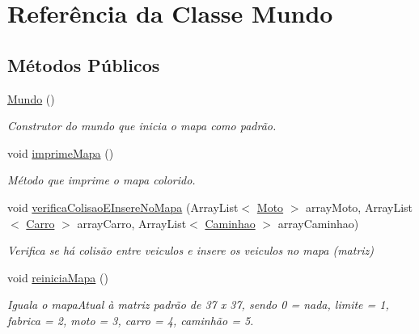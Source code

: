 \hypertarget{class_mundo}{}\section{Referência da Classe Mundo}
\label{class_mundo}
\subsection*{Métodos Públicos}
\begin{DoxyCompactItemize}
\item 
\mbox{\label{class_mundo_ae3801a0a633ad3475456c67639561105}} 
\mbox{\hyperlink{class_mundo_ae3801a0a633ad3475456c67639561105}{Mundo}} ()
\begin{DoxyCompactList}\small\item\em Construtor do mundo que inicia o mapa como padrão. \end{DoxyCompactList}\item 
void \mbox{\hyperlink{class_mundo_a1df37efee05155963d963b7f3ca07508}{imprime\+Mapa}} ()
\begin{DoxyCompactList}\small\item\em Método que imprime o mapa colorido. \end{DoxyCompactList}\item 
void \mbox{\hyperlink{class_mundo_ae896c013603704a78e4e9ca0c3b96356}{verifica\+Colisao\+E\+Insere\+No\+Mapa}} (Array\+List$<$ \mbox{\hyperlink{class_moto}{Moto}} $>$ array\+Moto, Array\+List$<$ \mbox{\hyperlink{class_carro}{Carro}} $>$ array\+Carro, Array\+List$<$ \mbox{\hyperlink{class_caminhao}{Caminhao}} $>$ array\+Caminhao)
\begin{DoxyCompactList}\small\item\em Verifica se há colisão entre veiculos e insere os veiculos no mapa (matriz) \end{DoxyCompactList}\item 
\mbox{\label{class_mundo_a1be59b32572a7a8a40fa84737722e015}} 
void \mbox{\hyperlink{class_mundo_a1be59b32572a7a8a40fa84737722e015}{reinicia\+Mapa}} ()
\begin{DoxyCompactList}\small\item\em Iguala o mapa\+Atual à matriz padrão de 37 x 37, sendo 0 = nada, limite = 1, fabrica = 2, moto = 3, carro = 4, caminhão = 5. \end{DoxyCompactList}\item 
\mbox{\label{class_mundo_acc3a26a242cfe494033e8f36bad5648b}} 

\end{DoxyCompactItemize}
